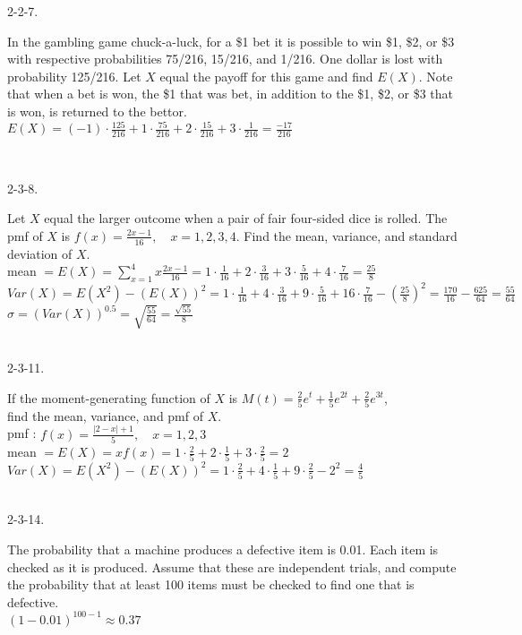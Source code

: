 \documentclass[12pt]{book}
\begin{document}
\begin{CJK}{UTF8}{bsmi}
2-2-7. \begin{minipage}[t]{\dimexpr\linewidth-2em}
In the gambling game chuck-a-luck, for a \$1 bet it is possible to win \$1, \$2, or \$3 with respective probabilities 75/216, 15/216, and 1/216. One dollar is lost with probability 125/216. Let $X$ equal the payoff for this game and find $E(X)$. Note that when a bet is won, the \$1 that was bet, in addition to the \$1, \$2, or \$3 that is won, is returned to the bettor. \\
$\displaystyle E(X)=(-1)\cdot\frac{125}{216}+1\cdot\frac{75}{216}+2\cdot\frac{15}{216}+3\cdot\frac{1}{216}=\frac{-17}{216}$
\end{minipage}\\

\clearpage

2-3-8. \begin{minipage}[t]{\dimexpr\linewidth-2em}
Let $X$ equal the larger outcome when a pair of fair four-sided dice is rolled. The pmf of $X$ is $\displaystyle f(x)=\frac{2x-1}{16},\quad x=1,2,3,4$. Find the mean, variance, and standard deviation of $X$. \\
mean $\displaystyle=E(X)=\sum_{x=1}^4x\frac{2x-1}{16}=1\cdot\frac{1}{16}+2\cdot\frac{3}{16}+3\cdot\frac{5}{16}+4\cdot\frac{7}{16}=\frac{25}{8}$ \\
$\displaystyle Var(X)=E(X^2)-(E(X))^2=1\cdot\frac{1}{16}+4\cdot\frac{3}{16}+9\cdot\frac{5}{16}+16\cdot\frac{7}{16}-\left(\frac{25}{8}\right)^2=\frac{170}{16}-\frac{625}{64}=\frac{55}{64}$ \\
$\displaystyle\sigma=\left(Var(X)\right)^{0.5}=\sqrt{\frac{55}{64}}=\frac{\sqrt{55}}{8}$
\end{minipage}\\

2-3-11. \begin{minipage}[t]{\dimexpr\linewidth-2em}
If the moment-generating function of $X$ is $\displaystyle M(t)=\frac{2}{5}e^t+\frac{1}{5}e^{2t}+\frac{2}{5}e^{3t}$, \\
find the mean, variance, and pmf of $X$. \\
pmf : $f(x)=\frac{|2-x|+1}{5},\quad x=1,2,3$ \\
mean $\displaystyle=E(X)=xf(x)=1\cdot\frac{2}{5}+2\cdot\frac{1}{5}+3\cdot\frac{2}{5}=2$ \\
$Var(X)=E(X^2)-(E(X))^2=1\cdot\frac{2}{5}+4\cdot\frac{1}{5}+9\cdot\frac{2}{5}-2^2=\frac{4}{5}$ \\
\end{minipage}\\

2-3-14. \begin{minipage}[t]{\dimexpr\linewidth-2em}
The probability that a machine produces a defective item is 0.01. Each item is checked as it is produced. Assume that these are independent trials, and compute the probability that at least 100 items must be checked to find one that is defective. \\
$(1-0.01)^{100-1}\approx0.37$
\end{minipage}\\

\end{CJK}
\end{document}
